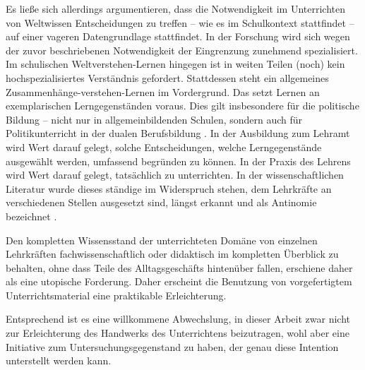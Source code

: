 Es ließe sich allerdings argumentieren, dass die Notwendigkeit im Unterrichten von Weltwissen Entscheidungen zu treffen -- wie es im Schulkontext stattfindet -- auf einer vageren Datengrundlage stattfindet. In der Forschung wird sich wegen der zuvor beschriebenen Notwendigkeit der Eingrenzung zunehmend spezialisiert. Im schulischen Weltverstehen-Lernen hingegen ist in weiten Teilen (noch) kein hochspezialisiertes Verständnis gefordert. Stattdessen steht ein allgemeines Zusammenhänge-verstehen-Lernen im Vordergrund. Das setzt Lernen an exemplarischen Lerngegenständen voraus. 
Dies gilt insbesondere für die politische Bildung -- nicht nur in allgemeinbildenden Schulen, sondern auch für Politikunterricht in der dualen Berufsbildung \autocite[vgl. \gls{abs} \ref{bplan}: \gls{S} \pageref{bplan} \&][4; 9-13]{bplan}.
In der Ausbildung zum Lehramt wird Wert darauf gelegt, solche Entscheidungen, welche Lerngegenstände ausgewählt werden, umfassend begründen zu können. 
In der Praxis des Lehrens wird Wert darauf gelegt, tatsächlich zu unterrichten.
In der wissenschaftlichen Literatur wurde dieses ständige im Widerspruch stehen, dem Lehrkräfte an verschiedenen Stellen ausgesetzt sind, längst erkannt und als Antinomie bezeichnet \autocite[\gls{vgl} \gls{zb}][]{Helsper.2001}.

Den kompletten Wissensstand der unterrichteten Domäne von einzelnen Lehrkräften fachwissenschaftlich oder didaktisch im kompletten Überblick zu behalten, ohne dass Teile des Alltagsgeschäfts hintenüber fallen, erschiene daher als eine utopische Forderung. Daher erscheint die Benutzung von vorgefertigtem Unterrichtsmaterial eine praktikable Erleichterung. 


Entsprechend ist es eine willkommene Abwechslung, in dieser Arbeit zwar nicht zur Erleichterung des Handwerks des Unterrichtens beizutragen, wohl aber eine Initiative zum Untersuchungsgegenstand zu haben, der genau diese Intention unterstellt werden kann. 


